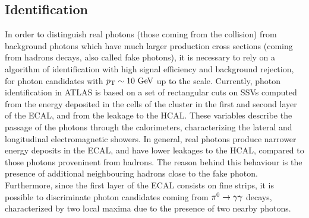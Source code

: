 \subsection{Identification}

In order to distinguish real photons (those coming from the collision) from background photons which have much larger production cross sections (coming from hadrons decays, also called fake photons), it is necessary to rely on a algorithm of identification with high signal efficiency and background rejection, for photon candidates with \(p_{\text{T}} \sim 10~\text{GeV}\) up to the \tev scale. 
Currently, photon identification in ATLAS is based on a set of rectangular cuts on \acp{SSV} computed from the energy deposited in the cells of the cluster in the first and second layer of the \ac{ECAL}, and from the leakage to the \ac{HCAL}. These variables describe the passage of the photons through the calorimeters, characterizing the lateral and longitudinal electromagnetic showers.
In general, real photons produce narrower energy deposits in the \ac{ECAL}, and have lower leakages to the \ac{HCAL}, compared to those photons proveninent from hadrons. The reason behind this behaviour is the presence of additional neighbouring hadrons close to the fake photon.
Furthermore, since the first layer of the \ac{ECAL} consists on fine strips, it is possible to discriminate photon candidates coming from \(\pi^{0}\rightarrow\gamma\gamma\) decays, characterized by two local maxima due to the presence of two nearby photons.

